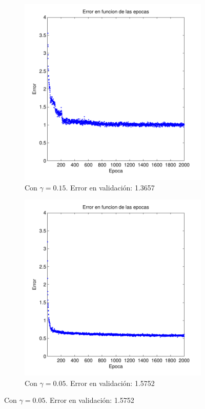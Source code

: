 \documentclass[informe.tex]{subfiles}
\begin{document}
    \begin{figure}[H]
        \centering
        \begin{subfigure}[b]{0.49\textwidth}
                \includegraphics[width=\textwidth]{graficos/error_fold2_20_binary-regresion_2000_015.pdf}
                \caption{Con $\gamma=0.15$. Error en validación: 1.3657}
                \label{fig:d2-f2-2k-015-n20}
        \end{subfigure}
        \begin{subfigure}[b]{0.49\textwidth}
                \includegraphics[width=\textwidth]{graficos/error_fold2_20_binary-regresion_2000_005.pdf}
                \caption{Con $\gamma=0.05$. Error en validación: 1.5752}
                \label{fig:d2-f2-2k-005-n20}
        \end{subfigure}
        

\end{figure}
\end{document}
